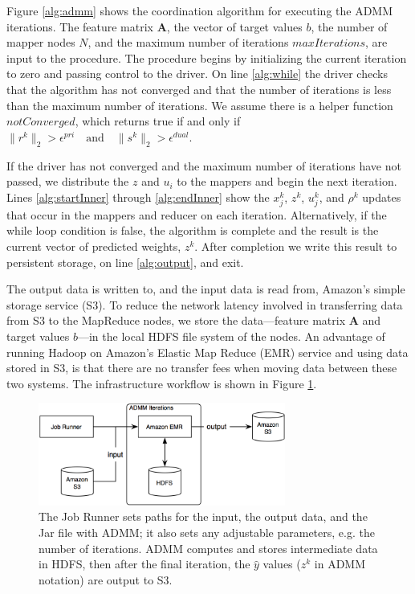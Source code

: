 \documentclass[10pt, conference, compsocconf]{IEEEtran}
\begin{document}
Figure \ref{alg:admm} shows the coordination algorithm for executing the ADMM iterations.  The feature matrix $\mathbf{A}$, the
vector of target values $b$, the number of mapper nodes $N$, and the maximum number of iterations $maxIterations$, are input to the procedure.  The procedure begins by initializing the current iteration to zero and passing control to the driver.  On line \ref{alg:while} the driver checks that the algorithm has not converged and that the number of iterations is less than the maximum number of iterations.  We assume there is a helper function $notConverged$, which returns true if and only if $\|r^k\|_2 > \epsilon^{pri} \quad\text{and}\quad \|s^k\|_2 > \epsilon^{dual}.$

If the driver has not converged and the maximum number of iterations have not passed, we distribute the $z$ and $u_i$ to the mappers and begin the next iteration.  Lines \ref{alg:startInner} through \ref{alg:endInner} show the $x_j^k$, $z^k$, $u_j^k$, and $\rho^k$ updates that occur in the mappers and reducer on each iteration.  Alternatively, if the while loop condition is false, the algorithm is complete and the result is the current vector of predicted weights, $z^k$.  After completion we write this result to persistent storage, on line \ref{alg:output}, and exit.

The output data is written to, and the input data is read from, Amazon's simple storage service (S3). To reduce the network latency involved in transferring data from S3 to the MapReduce nodes, we store the data---feature matrix $\mathbf{A}$ and target values $b$---in the local HDFS file system of the nodes.  An advantage of running Hadoop on Amazon's Elastic Map Reduce (EMR) service and using data stored in S3, is that there are no transfer fees when moving data between these two systems.  The infrastructure workflow is shown in Figure \ref{fig:workflow}.

\begin{figure}[!t]
\centering
\includegraphics[width=3.2in]{aws_implementation}
\caption{The Job Runner sets paths for the input, the output data, and the Jar file with ADMM; it also sets any adjustable parameters, e.g. the number of iterations.  ADMM computes and stores intermediate data in HDFS, then after the final iteration, the $\hat{y}$ values ($z^k$ in ADMM notation) are output to S3.}
\label{fig:workflow}
\end{figure}
\end{document}
